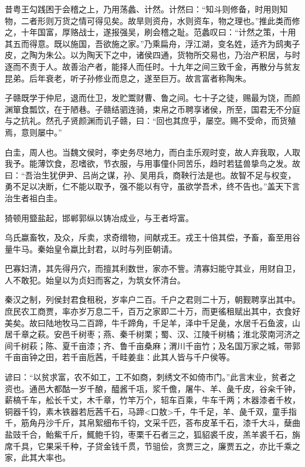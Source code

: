 \documentclass[]{article}
\begin{document}
昔粤王勾践困于会稽之上，乃用荡蠡、计然。计然曰：``知斗则修备，时用则知物，二者形则万货之情可得见矣。故旱则资舟，水则资车，物之理也。''推此类而修之，十年国富，厚赂战士，遂报强吴，刷会稽之耻。范蠡叹曰：``计然之策，十用其五而得意。既以施国，吾欲施之家。''乃乘扁舟，浮江湖，变名姓，适齐为鸱夷子皮，之陶为朱公。以为陶天下之中，诸侯四通，货物所交易也，乃治产积居，与时逐而不责于人。故善治产者，能择人而任时。十九年之间三致千金，再散分与贫友昆弟。后年衰老，听子孙修业而息之，遂至巨万。故言富者称陶朱。

子赣既学于仲尼，退而仕卫，发贮鬻财曹、鲁之间。七十子之徒，赐最为饶，而颜渊箪食瓢饮，在于陋巷。子赣结驷连骑，束帛之币聘享诸侯，所至，国君无不分庭与之抗礼。然孔子贤颜渊而讥子赣，曰：``回也其庶乎，屡空。赐不受命，而货殖焉，意则屡中。''

白圭，周人也。当魏文侯时，李史务尽地力，而白圭乐观时变，故人弃我取，人取我予。能薄饮食，忍嗜欲，节衣服，与用事僮仆同苦乐，趋时若猛兽挚鸟之发。故曰：``吾治生犹伊尹、吕尚之谋，孙、吴用兵，商鞅行法是也。故智不足与权变，勇不足以决断，仁不能以取予，强不能以有守，虽欲学吾术，终不告也。''盖天下言治生者祖白圭。

猗顿用盬盐起，邯郸郭纵以铸冶成业，与王者埒富。

乌氏蠃畜牧，及众，斥卖，求奇缯物，间献戎王。戎王十倍其偿，予畜，畜至用谷量牛马。秦始皇令蠃比封君，以时与列臣朝请。

巴寡妇清，其先得丹穴，而擅其利数世，家亦不訾。清寡妇能守其业，用财自卫，人不敢犯。始皇以为贞妇而客之，为筑女怀清台。

秦汉之制，列侯封君食租税，岁率户二百。千户之君则二十万，朝觐聘享出其中。庶民农工商贾，率亦岁万息二千，百万之家即二十万，而更徭租赋出其中，衣食好美矣。故曰陆地牧马二百蹄，牛千蹄角，千足羊，泽中千足彘，水居千石鱼波，山居千章之萩。安邑千树枣；燕、秦千树栗；蜀、汉、江陵千树橘；淮北荥南河济之间千树萩；陈、夏千亩漆；齐、鲁千亩桑麻；渭川千亩竹；及名国万家之城，带郭千亩亩钟之田，若千亩卮茜，千畦姜韭：此其人皆与千户侯等。

谚曰：``以贫求富，农不如工，工不如商，刺绣文不如倚市门。''此言末业，贫者之资也。通邑大都酤一岁千酿，醯酱千瓨，浆千儋，屠牛、羊、彘千皮，谷籴千钟，薪槁千车，舩长千丈，木千章，竹竿万个，轺车百乘，牛车千两；木器漆者千枚，铜器千钧，素木铁器若卮茜千石，马蹄\textless{}口敖\textgreater{}千，牛千足，羊、彘千双，童手指千，筋角丹沙千斤，其帛絮细布千钧，文采千匹，荅布皮革千石，漆千大斗，蘖曲盐豉千合，鲐鮆千斤，鮿鲍千钧，枣栗千石者三之，狐貂裘千皮，羔羊裘千石，旃席千具，它果采千种，子贷金钱千贯，节驵侩，贪贾三之，廉贾五之，亦比千乘之家，此其大率也。
\end{document}
